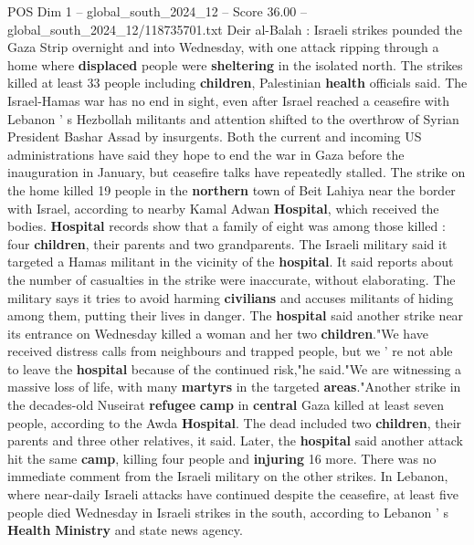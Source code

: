 \begin{textsample}{POS Dim 1 – global\_south\_2024\_12 – Score 36.00 – global\_south\_2024\_12/118735701.txt}  \label{ex:f1_pos_103}
Deir al-Balah : Israeli strikes pounded the Gaza Strip overnight and into Wednesday, with one attack ripping through a home where \textbf{displaced} people were \textbf{sheltering} in the isolated north.
The strikes killed at least 33 people including \textbf{children}, Palestinian \textbf{health} officials said.
The Israel-Hamas war has no end in sight, even after Israel reached a ceasefire with Lebanon ' s Hezbollah militants and attention shifted to the overthrow of Syrian President Bashar Assad by insurgents.
Both the current and incoming US administrations have said they hope to end the war in Gaza before the inauguration in January, but ceasefire talks have repeatedly stalled.
The strike on the home killed 19 people in the \textbf{northern} town of Beit Lahiya near the border with Israel, according to nearby Kamal Adwan \textbf{Hospital}, which received the bodies. \textbf{Hospital} records show that a family of eight was among those killed : four \textbf{children}, their parents and two grandparents.
The Israeli military said it targeted a Hamas militant in the vicinity of the \textbf{hospital}.
It said reports about the number of casualties in the strike were inaccurate, without elaborating.
The military says it tries to avoid harming \textbf{civilians} and accuses militants of hiding among them, putting their lives in danger.
The \textbf{hospital} said another strike near its entrance on Wednesday killed a woman and her two \textbf{children}."We have received distress calls from neighbours and trapped people, but we ' re not able to leave the \textbf{hospital} because of the continued risk,"he said."We are witnessing a massive loss of life, with many \textbf{martyrs} in the targeted \textbf{areas}."Another strike in the decades-old Nuseirat \textbf{refugee} \textbf{camp} in \textbf{central} Gaza killed at least seven people, according to the Awda \textbf{Hospital}.
The dead included two \textbf{children}, their parents and three other relatives, it said.
Later, the \textbf{hospital} said another attack hit the same \textbf{camp}, killing four people and \textbf{injuring} 16 more.
There was no immediate comment from the Israeli military on the other strikes.
In Lebanon, where near-daily Israeli attacks have continued despite the ceasefire, at least five people died Wednesday in Israeli strikes in the south, according to Lebanon ' s \textbf{Health} \textbf{Ministry} and state news agency.

\end{textsample}
